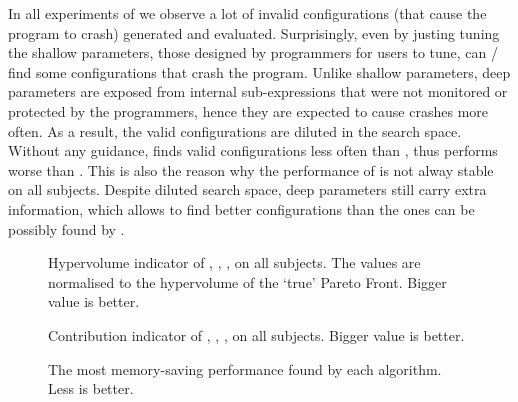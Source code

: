 In all experiments of \dr{} we observe a lot of invalid configurations (that cause the program to crash) generated and evaluated. Surprisingly, even by justing tuning the shallow parameters, those designed by programmers for users to tune, can \sr{}/\sn{} find some configurations that crash the program.
Unlike shallow parameters, deep parameters are exposed from internal sub-expressions that were not monitored or protected by the programmers, hence they are expected to cause crashes more often. As a result, the valid configurations are diluted in the search space. Without any guidance, \dr{} finds valid configurations less often than \sr{}, thus performs worse than \sr{}. This is also the reason why the performance of \dn{} is not alway stable on all subjects. Despite diluted search space, deep parameters still carry extra information, which allows \dn{} to find better configurations than the ones can be possibly found by \sn{}.
 
\begin{figure}[htbp]
	\centering
	\caption{Hypervolume indicator of \sr{}, \sn{}, \dr{}, \dn{} on all subjects. The values are normalised to the hypervolume of the `true' Pareto Front. Bigger value is better.}\label{fig_hypervolume}
\end{figure}

\begin{figure}[htbp]
	\centering
	\caption{Contribution indicator of \sr{}, \sn{}, \dr{}, \dn{} on all subjects. Bigger value is better.}\label{fig_contribution}
\end{figure}

\begin{figure}[htb]
	\centering
	\caption{The most memory-saving performance found by each algorithm. Less is better.}\label{fig_best_memory}
\end{figure}

